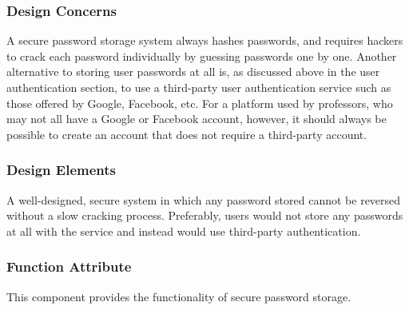 \documentclass[onecolumn, draftclsnofoot,10pt, compsoc]{IEEEtran}
\begin{document}
\subsubsection{Design Concerns}
\noindent A secure password storage system always hashes passwords, and requires hackers to crack each password individually by guessing passwords one by one. Another alternative to storing user passwords at all is, as discussed above in the user authentication section, to use a third-party user authentication service such as those offered by Google, Facebook, etc. For a platform used by professors, who may not all have a Google or Facebook account, however, it should always be possible to create an account that does not require a third-party account. \\

\subsubsection{Design Elements}
\noindent A well-designed, secure system in which any password stored cannot 
be reversed without a slow cracking process. Preferably, users would not store 
any passwords at all with the service and instead would use third-party 
authentication. \\


\subsubsection{Function Attribute}
\noindent This component provides the functionality of secure password storage. \\
\end{document}

